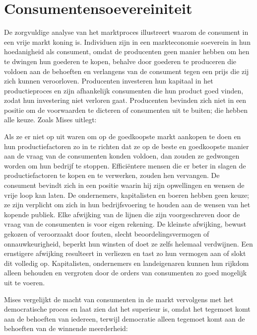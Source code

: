 \hypertarget{consumentensoevereiniteit}{%
\section{Consumentensoevereiniteit}\label{consumentensoevereiniteit}}

De zorgvuldige analyse van het marktproces illustreert waarom de consument in een vrije markt koning is. Individuen zijn in een markteconomie soeverein in hun hoedanigheid als consument, omdat de producenten geen manier hebben om hen te dwingen hun goederen te kopen, behalve door goederen te produceren die voldoen aan de behoeften en verlangens van de consument tegen een prijs die zij zich kunnen veroorloven. Producenten investeren hun kapitaal in het productieproces en zijn afhankelijk consumenten die hun product goed vinden, zodat hun investering niet verloren gaat. Producenten bevinden zich niet in een positie om de voorwaarden te dicteren of consumenten uit te buiten; die hebben alle keuze. Zoals Mises uitlegt:

\begin{blockquotebox}
    Als ze er niet op uit waren om op de goedkoopste markt aankopen te doen en hun productiefactoren zo in te richten dat ze op de beste en goedkoopste manier aan de vraag van de consumenten konden voldoen, dan zouden ze gedwongen worden om hun bedrijf te stoppen. Efficiëntere mensen die er beter in slagen de productiefactoren te kopen en te verwerken, zouden hen vervangen. De consument bevindt zich in een positie waarin hij zijn opwellingen en wensen de vrije loop kan laten. De ondernemers, kapitalisten en boeren hebben geen keuze; ze zijn verplicht om zich in hun bedrijfsvoering te houden aan de wensen van het kopende publiek. Elke afwijking van de lijnen die zijn voorgeschreven door de vraag van de consumenten is voor eigen rekening. De kleinste afwijking, bewust gekozen of veroorzaakt door fouten, slecht beoordelingsvermogen of onnauwkeurigheid, beperkt hun winsten of doet ze zelfs helemaal verdwijnen. Een ernstigere afwijking resulteert in verliezen en tast zo hun vermogen aan of slokt dit volledig op. Kapitalisten, ondernemers en landeigenaren kunnen hun rijkdom alleen behouden en vergroten door de orders van consumenten zo goed mogelijk uit te voeren.\footnotemark    
\end{blockquotebox}
\autocite{127}

Mises vergelijkt de macht van consumenten in de markt vervolgens met het democratische proces en laat zien dat het superieur is, omdat het tegemoet komt aan de behoeften van iedereen, terwijl democratie alleen tegemoet komt aan de behoeften van de winnende meerderheid:

